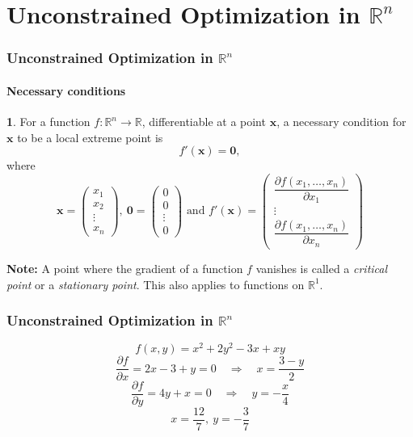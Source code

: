 \documentclass[10pt]{beamer}
\theoremstyle{definition}
\newtheorem{Fact}{\translate{Fact}}
\begin{document}
\section{Unconstrained Optimization in $ \mathbb{R}^n $}\label{sec:Rn}

\begin{frame}[fragile]
\frametitle{Unconstrained Optimization in $ \mathbb{R}^n $}
\framesubtitle{Necessary conditions}
\begin{Fact}
For a function $ f: \mathbb{R}^n \rightarrow \mathbb{R}$, differentiable at a point $ \mathbf{x} $, a necessary condition for $ \mathbf{x} $ to be a local extreme point is \[ f'(\mathbf{x}) = \mathbf{0}, \]
where \[ \mathbf{x} = \left( \begin{array}{c}
x_1 \\
x_2\\
\vdots \\
x_n
\end{array}\right),~\mathbf{0} = \left( \begin{array}{c}
0 \\
0 \\
\vdots \\
0
\end{array}\right)\text{ and }  f'(\mathbf{x}) = \left( \begin{array}{c}
\dfrac{\partial f(x_1,\ldots,x_n)}{\partial x_1}\\
\vdots \\
\dfrac{\partial f(x_1,\ldots,x_n)}{\partial x_n}
\end{array}\right) \]
\label{fc:NCsRn}
\end{Fact}

\textbf{Note:} A point where the gradient of a function $ f $ vanishes is called a \emph{critical point} or a \emph{stationary point}. This also applies to functions on $ \mathbb{R}^1 $.
\end{frame}

\begin{frame}[fragile]
\frametitle{Unconstrained Optimization in $ \mathbb{R}^n $}
\begin{example}
\[ f(x,y) = x^2 +2y^2-3x+xy \]
\[ \frac{\partial f}{\partial x} = 2x-3+y=0\quad \Rightarrow \quad x=\frac{3-y}{2} \]
\[ \frac{\partial f}{\partial y} = 4y+x = 0\quad \Rightarrow \quad y = -\frac{x}{4}\]
\[ x=\frac{12}{7},~y=-\frac{3}{7} \]
\end{example}
\end{frame}
\end{document}

